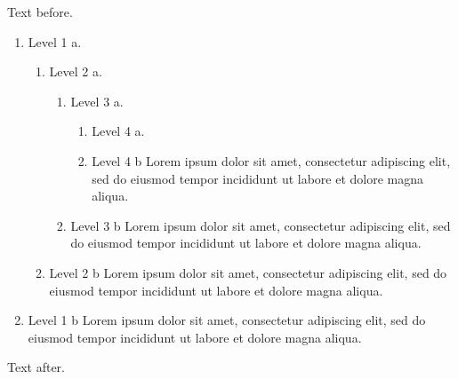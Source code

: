 \documentclass[11pt]{article}
\begin{document}
Text before.
\begin{enumerate}
\item Level 1 a.
\begin{enumerate}
\item Level 2 a.
\begin{enumerate}
\item Level 3 a.
\begin{enumerate}
\item Level 4 a.
\item Level 4 b Lorem ipsum dolor sit amet, consectetur adipiscing elit, sed do eiusmod tempor incididunt ut labore et dolore magna aliqua.
\end{enumerate}
\item Level 3 b Lorem ipsum dolor sit amet, consectetur adipiscing elit, sed do eiusmod tempor incididunt ut labore et dolore magna aliqua.
\end{enumerate}
\item Level 2 b Lorem ipsum dolor sit amet, consectetur adipiscing elit, sed do eiusmod tempor incididunt ut labore et dolore magna aliqua.
\end{enumerate}
\item Level 1 b Lorem ipsum dolor sit amet, consectetur adipiscing elit, sed do eiusmod tempor incididunt ut labore et dolore magna aliqua.
\end{enumerate}
Text after.
\end{document}
